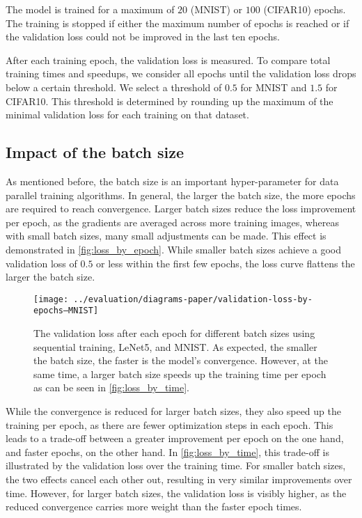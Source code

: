 \documentclass[conference,compsoc,a4paper]{IEEEtran}
\begin{document}
The model is trained for a maximum of $20$ (MNIST) or $100$ (CIFAR10) epochs.
The training is stopped if either the maximum number of epochs is reached or if the validation loss could not be improved in the last ten epochs.

After each training epoch, the validation loss is measured.
To compare total training times and speedups, we consider all epochs until the validation loss drops below a certain threshold.
We select a threshold of $0.5$ for MNIST and $1.5$ for CIFAR10.
This threshold is determined by rounding up the maximum of the minimal validation loss for each training on that dataset.


\subsection{Impact of the batch size} %
\label{sub:impact_of_the_batch_size}
As mentioned before, the batch size is an important hyper-parameter for data parallel training algorithms.
In general, the larger the batch size, the more epochs are required to reach convergence.
Larger batch sizes reduce the loss improvement per epoch, as the gradients are averaged across more training images, whereas with small batch sizes, many small adjustments can be made.
%
This effect is demonstrated in \autoref{fig:loss_by_epoch}.
While smaller batch sizes achieve a good validation loss of $0.5$ or less within the first few epochs, the loss curve flattens the larger the batch size.

\begin{figure}[ht]
\centering
\texttt{[image: ../evaluation/diagrams-paper/validation-loss-by-epochs--MNIST]}
\caption{The validation loss after each epoch for different batch sizes using sequential training, LeNet5, and MNIST.
As expected, the smaller the batch size, the faster is the model's convergence.
However, at the same time, a larger batch size speeds up the training time per epoch as can be seen in \autoref{fig:loss_by_time}.}
\label{fig:loss_by_epoch}
\end{figure}

While the convergence is reduced for larger batch sizes, they also speed up the training per epoch, as there are fewer optimization steps in each epoch.
This leads to a trade-off between a greater improvement per epoch on the one hand, and faster epochs, on the other hand.
In \autoref{fig:loss_by_time}, this trade-off is illustrated by the validation loss over the training time.
For smaller batch sizes, the two effects cancel each other out, resulting in very similar improvements over time.
However, for larger batch sizes, the validation loss is visibly higher, as the reduced convergence carries more weight than the faster epoch times.
\end{document}
